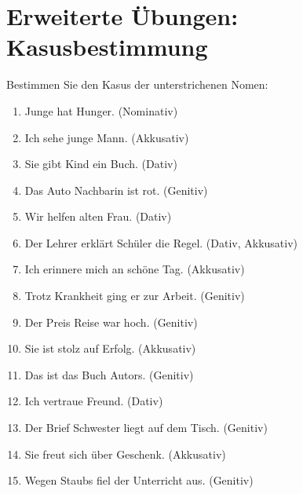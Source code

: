 \section{Erweiterte Übungen: Kasusbestimmung}
\label{sec:ErweiterteUebungen}

Bestimmen Sie den Kasus der unterstrichenen Nomen:

\begin{enumerate}
    \item \underline{\hspace{1.5cm}} Junge hat Hunger. (Nominativ)
    \item Ich sehe \underline{\hspace{1.5cm}} junge Mann. (Akkusativ)
    \item Sie gibt \underline{\hspace{1.5cm}} Kind ein Buch. (Dativ)
    \item Das Auto \underline{\hspace{1.5cm}} Nachbarin ist rot. (Genitiv)
    \item Wir helfen \underline{\hspace{1.5cm}} alten Frau. (Dativ)
    \item Der Lehrer erklärt \underline{\hspace{1.5cm}} Schüler die Regel. (Dativ, Akkusativ)
    \item Ich erinnere mich an \underline{\hspace{1.5cm}} schöne Tag. (Akkusativ)
    \item Trotz \underline{\hspace{1.5cm}} Krankheit ging er zur Arbeit. (Genitiv)
    \item Der Preis \underline{\hspace{1.5cm}} Reise war hoch. (Genitiv)
    \item Sie ist stolz auf \underline{\hspace{1.5cm}} Erfolg. (Akkusativ)
    \item Das ist das Buch \underline{\hspace{1.5cm}} Autors. (Genitiv)
    \item Ich vertraue \underline{\hspace{1.5cm}} Freund. (Dativ)
    \item Der Brief \underline{\hspace{1.5cm}} Schwester liegt auf dem Tisch. (Genitiv)
    \item Sie freut sich über \underline{\hspace{1.5cm}} Geschenk. (Akkusativ)
    \item Wegen \underline{\hspace{1.5cm}} Staubs fiel der Unterricht aus. (Genitiv)
\end{enumerate}

